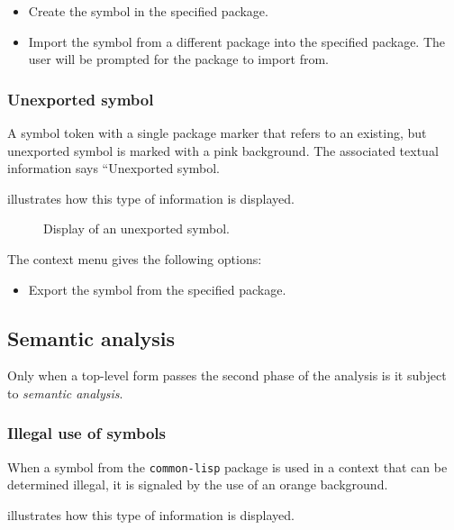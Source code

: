 \begin{itemize}
\item Create the symbol in the specified package.
\item Import the symbol from a different package into the specified
  package.  The user will be prompted for the package to import from.
\end{itemize}

\subsubsection{Unexported symbol}

A symbol token with a single package marker that refers to an
existing, but unexported symbol is marked with a pink background.  The
associated textual information says ``Unexported symbol.

 illustrates how this type of
information is displayed.

\begin{figure}
\begin{center}
\end{center}
\caption{\label{fig-unexported-symbol}
Display of an unexported symbol.}
\end{figure}

The context menu gives the following options:

\begin{itemize}
\item Export the symbol from the specified package.
\end{itemize}

\subsection{Semantic analysis}

Only when a top-level form passes the second phase of the analysis is
it subject to \emph{semantic analysis}.  

\subsubsection{Illegal use of \commonlisp{} symbols}

When a symbol from the \texttt{common-lisp} package is used in a
context that can be determined illegal, it is signaled by the use of
an orange background.

 illustrates how this type of
information is displayed.

